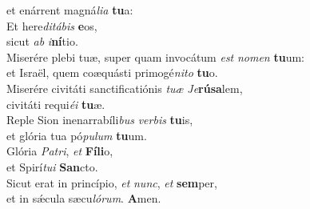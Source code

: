 \evenverse et enárrent magná\textit{li}\textit{a} \textbf{tu}a:\\
\oddverse Et here\textit{di}\textit{tá}\textit{bis} \textbf{e}os,~\*\\
\oddverse sicut \textit{ab} \textit{i}\textbf{ní}tio.\\
\evenverse Miserére plebi tuæ, super quam invocátum \textit{est} \textit{no}\textit{men} \textbf{tu}um:~\*\\
\evenverse et Israël, quem coæquásti primogé\textit{ni}\textit{to} \textbf{tu}o.\\
\oddverse Miserére civitáti sanctificatiónis \textit{tu}\textit{æ} \textit{Je}\textbf{rú}\textbf{sa}lem,~\*\\
\oddverse civitáti requi\textit{é}\textit{i} \textbf{tu}æ.\\
\evenverse Reple Sion inenarrabíli\textit{bus} \textit{ver}\textit{bis} \textbf{tu}is,~\*\\
\evenverse et glória tua pó\textit{pu}\textit{lum} \textbf{tu}um.\\
\oddverse Glória \textit{Pa}\textit{tri}, \textit{et} \textbf{Fí}\textbf{li}o,~\*\\
\oddverse et Spirí\textit{tu}\textit{i} \textbf{San}cto.\\
\evenverse Sicut erat in princípio, \textit{et} \textit{nunc}, \textit{et} \textbf{sem}per,~\*\\
\evenverse et in sǽcula sæcu\textit{ló}\textit{rum}. \textbf{A}men.\\
